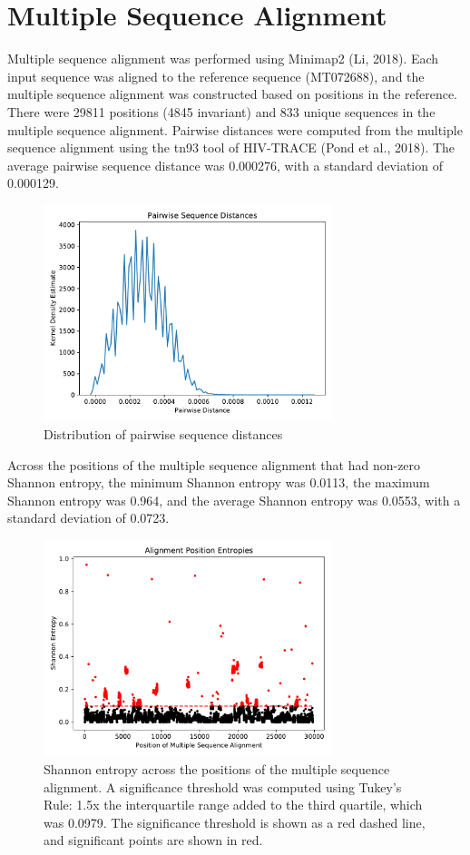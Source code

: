 \documentclass{article}
\begin{document}
\section{Multiple Sequence Alignment}
Multiple sequence alignment was performed using Minimap2 (Li, 2018). Each input sequence was aligned to the reference sequence (MT072688), and the multiple sequence alignment was constructed based on positions in the reference. There were 29811 positions (4845 invariant) and 833 unique sequences in the multiple sequence alignment. Pairwise distances were computed from the multiple sequence alignment using the tn93 tool of HIV-TRACE (Pond et al., 2018). The average pairwise sequence distance was 0.000276, with a standard deviation of 0.000129.

\begin{figure}[h]
\centering
\includegraphics[width=0.75\textwidth,keepaspectratio]{./figs/pairwise_distances_sequences.pdf}
\caption{Distribution of pairwise sequence distances}
\end{figure}

 Across the positions of the multiple sequence alignment that had non-zero Shannon entropy, the minimum Shannon entropy was 0.0113, the maximum Shannon entropy was 0.964, and the average Shannon entropy was 0.0553, with a standard deviation of 0.0723.

\begin{figure}[h]
\centering
\includegraphics[width=0.75\textwidth,keepaspectratio]{./figs/alignment_entropies.pdf}
\caption{Shannon entropy across the positions of the multiple sequence alignment. A significance threshold was computed using Tukey's Rule: 1.5x the interquartile range added to the third quartile, which was 0.0979. The significance threshold is shown as a red dashed line, and significant points are shown in red.}
\end{figure}
\end{document}

